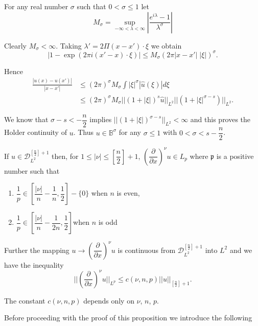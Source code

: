 For any real number $\sigma$ such that $0  < \sigma \leq 1$ let  
\begin{equation}
M_\sigma = \sup_{-\infty < \lambda < \infty} \left| \frac{e^{i \lambda} -
  1}{\lambda^\sigma}\right|\tag{1.10} \label{chap5-eq1.10} 
\end{equation} 

Clearly $M_\sigma < \infty$. Taking $\lambda'  = 2 \Pi (x -
x') \cdot \xi$ we obtain  
$$
|1 - \exp (2 \pi i (x' - x) \cdot \xi ) | \leq M_\sigma (2 \pi |x- x'|
\; |\xi |)^\sigma. 
$$

Hence\pageoriginale
\begin{align*}
\frac{| u (x) - u(x')|}{|x-x'|} & \leq  (2 \pi )^\sigma M_\sigma \int |
\xi |^\sigma | \hat{u} (\xi ) |d \xi \\ 
& \leq (2 \pi )^\sigma M_\sigma || (1 + | \xi | )^s \hat{u} ||_{L^2} ||
(1+ |\xi|^{\sigma -s}) ||_{L^2}. 
\end{align*}

We know that $\sigma - s < - \dfrac{n}{2}$ implies $|| (1+ | \xi
|)^{\sigma -s} ||_{L^2} < \infty$ and this proves the Holder
continuity of $u$. Thus $u \in \mathbb{B}^\sigma$ for any
$\sigma \leq 1$ with $0 < \sigma < s - \dfrac{n}{2}$. 

\begin{proposition}\label{chap5-sec1-prop2} %
If $u \in \mathscr{D}^{[\frac{n}{2}]+1}_{L^2}$ then, for $1
\leq | \nu | \leq \left[\dfrac{n}{2}\right] + 1$,
$\left(\dfrac{\partial}{\partial x}\right)^\nu u \in L_p$ 
where $\mathfrak{p}$ is a positive number such that  
\begin{enumerate}[\rm(a)]
\item $\dfrac{1}{p} \in \left[ \dfrac{|\nu|}{n} -
  \dfrac{1}{n}, \dfrac{1}{2} \right] - \{ 0 \}$ when $n$ is even,  

\item $\dfrac{1}{p} \in \left[ \dfrac{|\nu|}{n} -
  \dfrac{1}{2n}, \dfrac{1}{2}\right]$\quad when $n$ is odd 
\end{enumerate}

Further the mapping $u \to \left(\dfrac{\partial}{\partial
  x}\right)^\nu u$ is continuous from $\mathscr{D}^{[\frac{n}{2}] +
  1}_{L^2}$ into $L^2$ and we have the inequality 
\begin{equation}
|| \left(\frac{\partial}{\partial x}\right)^\nu u ||_{L^p} \leq c (\nu, n, p) ||
u ||_{[\frac{n}{2}]+1}.\tag{1.11}\label{chap5-eq1.11} 
\end{equation}

The constant $c(\nu, n, p)$ depends only on $\nu$, $n$, $p$.

Before proceeding with the proof of this proposition we introduce the
following
\end{proposition}


